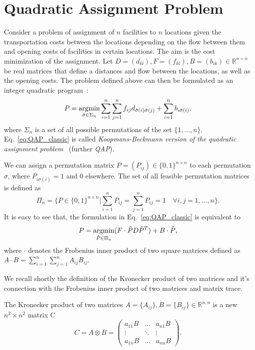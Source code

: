 \chapter{Quadratic Assignment Problem}\label{appendixA}
Consider a problem of assignment of $n$ facilities to $n$ locations given the transportation costs between the locations depending on the flow between them and opening costs of facilities in certain locations. The aim is the cost minimization of the assignment. Let $D=(d_{kl}),F=(f_{kl}), B=(b_{ik})\in\mathbb{R}^{n\times n}$ be real matrices that define a distances and flow between the locations, as well as the opening costs. The problem defined above can then be formulated as an integer quadratic program~\cite{Burkard98thequadratic,Koopman_Backman}:
\begin{equation}\label{eq:QAP_classic}
P = \mathop{\rm argmin}_{\hat{\sigma}\in\Sigma_n}\sum_{i=1}^{n}\sum_{j=1}^{n}f_{ij}d_{\hat{\sigma}(i)\hat{\sigma}(j)}+\sum_{i=1}^{n}b_{i\hat{\sigma}(i)},
\end{equation}
where $\Sigma_n$ is a set of all possible permutations of the set $\{1,\dots,n\}$. Eq.~\eqref{eq:QAP_classic} is called \emph{Koopmans-Beckmann version of the quadratic assignment problem}~\cite{Burkard98thequadratic} (further \emph{QAP}).

We can assign a permutation matrix $P=(P_{ij})\in\{0,1\}^{n\times n}$ to each permutation $\sigma$, where $P_{i\sigma(i)}=1$ and $0$ elsewhere. The set of all feasible permutation matrices is defined as
\begin{equation*}
\Pi_n=\{P\in\{0,1\}^{n\times n}|\sum_{i=1}^{n}P_{ij}=\sum_{j=1}^{n}P_{ij}=1\quad\forall i,j=1,\dots,n\}.
\end{equation*}
It is easy to see that, the formulation in Eq.~\eqref{eq:QAP_classic} %
is equivalent to
\begin{equation}\label{eq:QAP_classic2}
P = \mathop{\rm argmin}_{\hat{P}\in\Pi_n}(F\cdot \hat{P}D\hat{P}^T)+B\cdot\hat{P},
\end{equation}
where $\cdot$ denotes the Frobenius inner product of two square matrices defined as $A\cdot B=\sum_{i=1}^{n}\sum_{j=1}^{n}A_{ij}B_{ij}$.

We recall shortly the definition of the Kronecker product of two matrices and it's connection with the Frobenius inner product of two matrices and matrix trace.

The Kronecker  product of two matrices $A=\{A_{ij}\},B=\{B_{ij}\}\in\mathbb{R}^{n,n}$ is a new $n^2\times n^2$ matrix C
\begin{equation}\label{eq:kronecker}
C=A\otimes B =  	
\begin{pmatrix} a_{11}B & \dots & a_{n1}B \\ \vdots & \ddots & \vdots \\ a_{1n}B & \dots & a_{nn}B  \end{pmatrix}.
\end{equation}

